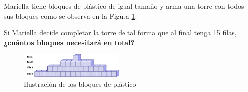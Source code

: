 Mariella tiene bloques de plástico de igual tamaño y arma una torre con todos sus bloques como se observa en la Figura \ref{fig:bloques_plastico}:

Si Mariella decide completar la torre de tal forma que al final tenga 15 filas,
\textbf{¿cuántos bloques necesitará en total?}

\begin{figure}[H]
    \centering
    \includegraphics[width=0.45\textwidth]{../images/57c79607ac0a75446759bf7de89522cf0cbcea57}
    \caption{Ilustración de los bloques de plástico}
    \label{fig:bloques_plastico}
\end{figure}
